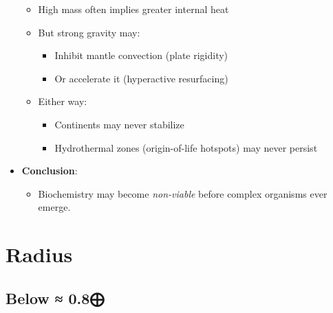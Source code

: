 \documentclass[
  letterpaper,
]{book}
\providecommand{\tightlist}{%
  \setlength{\itemsep}{0pt}\setlength{\parskip}{0pt}}
\begin{document}
\begin{itemize}
  \begin{itemize}
  \tightlist
  \item
    High mass often implies greater internal heat
  \item
    But strong gravity may:

    \begin{itemize}
    \tightlist
    \item
      Inhibit mantle convection (plate rigidity)
    \item
      Or accelerate it (hyperactive resurfacing)
    \end{itemize}
  \item
    Either way:

    \begin{itemize}
    \tightlist
    \item
      Continents may never stabilize
    \item
      Hydrothermal zones (origin-of-life hotspots) may never persist
    \end{itemize}
  \end{itemize}
\item
  \textbf{Conclusion}:

  \begin{itemize}
  \tightlist
  \item
    Biochemistry may become \emph{non-viable} before complex organisms
    ever emerge.
  \end{itemize}
\end{itemize}

\chapter{Radius}\label{radius}

\section{Below ≈ 0.8⨁}\label{below-0.8}
\end{document}
